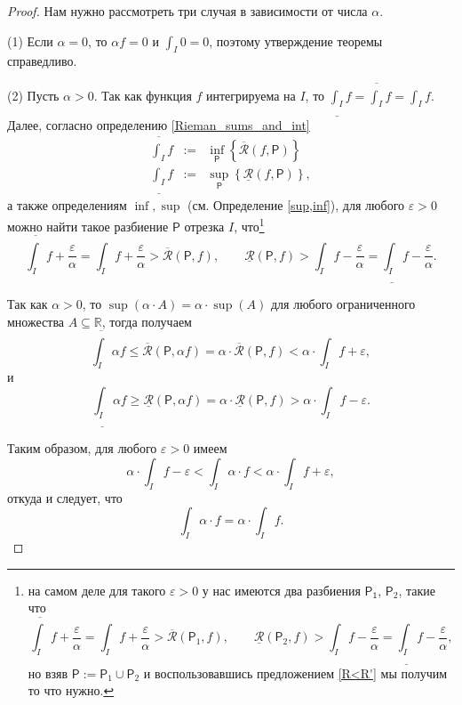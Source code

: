 \begin{proof} Нам нужно рассмотреть три случая в зависимости от числа $\alpha.$

(1) Если $\alpha =0$, то $\alpha f =0$ и $\int_I 0 = 0$, поэтому утверждение теоремы справедливо.

(2) Пусть $\alpha >0$. Так как функция $f$ интегрируема на $I$, то $\underline{\int_I}f = \overline{\int_I}f = \int_I f$. Далее, согласно определению \ref{Rieman_sums_and_int}
 \begin{eqnarray*}
 \overline{\int_I} f &:=& \inf_\mathsf{P} \left\{\overline{\mathcal{R}} (f, \mathsf{P}) \right\} \\
 \underline{\int_I} f &:=& \sup_\mathsf{P} \left\{\underline{\mathcal{R}} (f, \mathsf{P}) \right\},
\end{eqnarray*}
а также определениям $\inf,\sup$ (см. Определение \ref{sup,inf}), для любого $\varepsilon>0$ можно найти такое разбиение $\mathsf{P}$ отрезка $I$, что\footnote{на самом деле для такого $\varepsilon>0$ у нас имеются два разбиения $\mathsf{P_1}$, $\mathsf{P}_2$, такие что \[
  \overline{\int_I}f + \frac{\varepsilon}{\alpha} = \int_I f + \frac{\varepsilon}{\alpha} > \overline{\mathcal{R}}(\mathsf{P}_1,f), \qquad \underline{\mathcal{R}}(\mathsf{P}_2,f) > \int_I f - \frac{\varepsilon}{\alpha} = \underline{\int_I}f - \frac{\varepsilon}{\alpha},
\]
но взяв $\mathsf{P}:=\mathsf{P}_1 \cup \mathsf{P}_2$ и воспользовавшись предложением \ref{R<R'} мы получим то что нужно.
}
\[
  \overline{\int_I}f + \frac{\varepsilon}{\alpha} = \int_I f + \frac{\varepsilon}{\alpha} > \overline{\mathcal{R}}(\mathsf{P},f), \qquad \underline{\mathcal{R}}(\mathsf{P},f) > \int_I f - \frac{\varepsilon}{\alpha} = \underline{\int_I}f - \frac{\varepsilon}{\alpha}.
\]

Так как $\alpha>0$, то $\sup(\alpha \cdot A) = \alpha \cdot \sup(A)$ для любого ограниченного множества $A\subseteq \mathbb{R}$, тогда получаем
\[
 \overline{\int_I}\alpha f \le \overline{\mathcal{R}}(\mathsf{P},\alpha f) = \alpha \cdot \overline{\mathcal{R}}(\mathsf{P},f) < \alpha \cdot \int_I f + \varepsilon,
\]
и
\[
 \underline{\int_I}\alpha f \ge \underline{\mathcal{R}}(\mathsf{P},\alpha f) = \alpha \cdot \underline{\mathcal{R}}(\mathsf{P},f) > \alpha \cdot \int_I f - \varepsilon.
\]

Таким образом, для любого $\varepsilon>0$ имеем
\[
 \alpha \cdot \int_I f - \varepsilon < \int_I \alpha \cdot f < \alpha \cdot \int_I f + \varepsilon,
\]
откуда и следует, что 
\[
 \int_I \alpha \cdot f = \alpha \cdot \int_I f.
\]


\end{proof}
